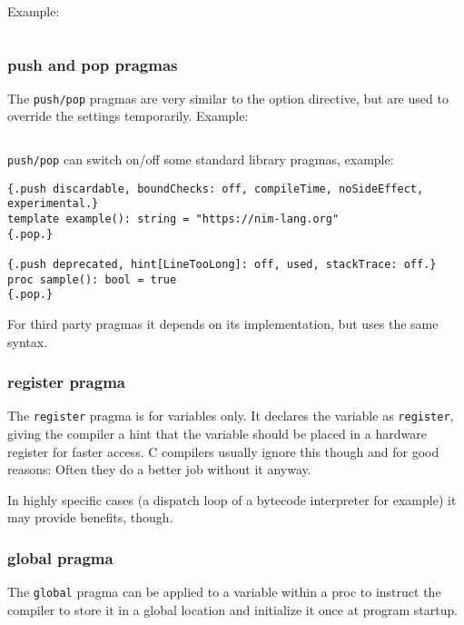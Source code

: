 Example:

\begin{verbatim}
\end{verbatim}

\hypertarget{push-and-pop-pragmas}{%
\subsubsection{push and pop pragmas}\label{push-and-pop-pragmas}}

The \texttt{push/pop} pragmas are very similar to the option directive,
but are used to override the settings temporarily. Example:

\begin{verbatim}
\end{verbatim}

\texttt{push/pop} can switch on/off some standard library pragmas,
example:

\begin{verbatim}
{.push discardable, boundChecks: off, compileTime, noSideEffect, experimental.}
template example(): string = "https://nim-lang.org"
{.pop.}

{.push deprecated, hint[LineTooLong]: off, used, stackTrace: off.}
proc sample(): bool = true
{.pop.}
\end{verbatim}

For third party pragmas it depends on its implementation, but uses the
same syntax.

\hypertarget{register-pragma}{%
\subsubsection{register pragma}\label{register-pragma}}

The \texttt{register} pragma is for variables only. It declares the
variable as \texttt{register}, giving the compiler a hint that the
variable should be placed in a hardware register for faster access. C
compilers usually ignore this though and for good reasons: Often they do
a better job without it anyway.

In highly specific cases (a dispatch loop of a bytecode interpreter for
example) it may provide benefits, though.

\hypertarget{global-pragma}{%
\subsubsection{global pragma}\label{global-pragma}}

The \texttt{global} pragma can be applied to a variable within a proc to
instruct the compiler to store it in a global location and initialize it
once at program startup.

